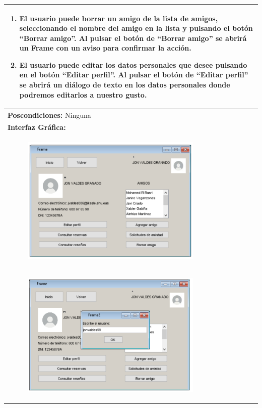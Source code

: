 \documentclass{report}
\begin{document}
\begin{center}
\begin{longtable}{|p{\linewidth}|}
\begin{enumerate}
                    \item El usuario puede borrar un amigo de la lista de amigos, seleccionando el nombre del amigo en la lista y pulsando el botón “Borrar amigo”. Al pulsar el botón de “Borrar amigo” se abrirá un Frame con un aviso para confirmar la acción.
                    \item El usuario puede editar los datos personales que desee pulsando en el botón “Editar perfil”. Al pulsar el botón de “Editar perfil” se abrirá un diálogo de texto en los datos personales donde podremos editarlos a nuestro gusto.  
                \end{enumerate}\\
                \hline
                \textbf{Poscondiciones:} Ninguna\\
                \hline
                \textbf{Interfaz Gráfica:}\\
                \begin{figure}[H]
                    \centering
                    \includegraphics[width=0.8\textwidth]{./img/grafico/InterfazMenu.png}
                \end{figure}\\
                \hline
                \begin{figure}[H]
                    \centering
                    \includegraphics[width=0.8\textwidth]{./img/grafico/InterfazAnadrAmigo.png}

\end{figure}
\end{longtable}
\end{center}
\end{document}
